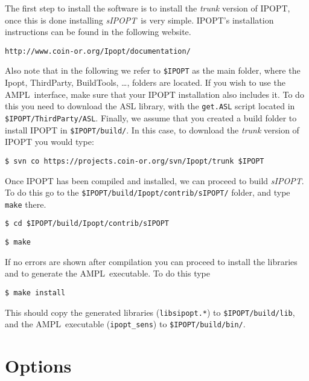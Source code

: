 \documentclass[letter, 11pt]{article}
\newcommand{\sensKKT}{\emph{sIPOPT}}
\newcommand{\AMPL}{AMPL}
\newcommand{\ipoptf}{\$IPOPT}
\newcommand{\sensdir}{sIPOPT}
\newcommand{\sensexe}{ipopt\_sens}
\newcommand{\senslib}{libsipopt}
\begin{document}
The first step to install the software is to install the \emph{trunk} version of IPOPT, once this is done
installing \sensKKT\ is very simple. IPOPT's installation instructions can be
found in the following website.

\begin{description}
\item \texttt{http://www.coin-or.org/Ipopt/documentation/}
\end{description}

Also note that in the following we refer to {\tt \ipoptf} as the main folder,
where the Ipopt, ThirdParty, BuildTools, \ldots,
folders are located. If you wish to use the \AMPL\ interface, make sure that your IPOPT
installation also includes it. To
do this you need to download the ASL library, with the {\tt get.ASL}
script located in {\tt \ipoptf/ThirdParty/ASL}. Finally, we assume that you created
a build folder to install IPOPT in  {\tt \ipoptf/build/}. In this case, to download
the \emph{trunk} version of IPOPT you would type:

\begin{description}
  \item  {\tt \$ svn co https://projects.coin-or.org/svn/Ipopt/trunk \ipoptf}
\end{description}

Once IPOPT has been compiled and installed, we can proceed to build \sensKKT. To do this go
to the {\tt \ipoptf/build/Ipopt/contrib/\sensdir/} folder, and type {\tt make} there.

\begin{description}
  \item  {\tt \$ cd \ipoptf/build/Ipopt/contrib/\sensdir}
  \item  {\tt \$ make}
\end{description}

If no errors are shown after compilation you can proceed to install the libraries and
to generate the \AMPL\ executable. To do this type

\begin{description}
  \item  {\tt \$ make install}
\end{description}

This should copy the generated libraries ({\tt \senslib.*}) to {\tt \ipoptf/build/lib}, and the \AMPL\
executable ({\tt \sensexe}) to {\tt \ipoptf/build/bin/}.

\section{Options}
\end{document}
